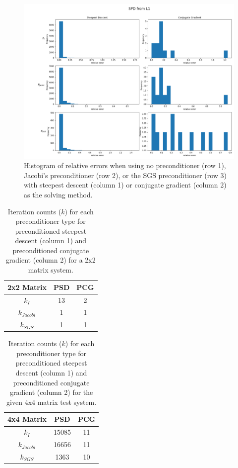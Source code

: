 \documentclass[11pt]{article}
\begin{document}
\begin{figure}[h!]
	\hspace*{-3cm}
	\centering
	\includegraphics[width=1.3\linewidth]{../figures/SPD L1 Histogram}
	\caption{Histogram of relative errors when using no preconditioner (row 1), Jacobi's preconditioner (row 2), or the SGS preconditioner (row 3) with steepest descent (column 1) or conjugate gradient (column 2) as the solving method.}
	\label{fig:HistSPD}
\end{figure}
\clearpage



\begin{table}[h!]
	\centering
	\begin{tabular}{|c|c|c|}
	\hline
	2x2 Matrix   	 & PSD & PCG \\ \hline
	$k_I$        	 & 13  & 2   \\ \hline
	$k_{Jacobi}$ & 1   & 1   \\ \hline
	$k_{SGS}$     & 1   & 1   \\ \hline
	\end{tabular}
	\caption{Iteration counts ($k$) for each preconditioner type for preconditioned steepest descent (column 1) and preconditioned conjugate gradient (column 2) for a 2x2 matrix system.}
	\label{tab:k2}
\end{table}

\begin{table}[h!]
	\centering
	\begin{tabular}{|c|c|c|}
	\hline
	4x4 Matrix  	 & PSD  & PCG \\ \hline
	$k_I$        	 & 15085 & 11  \\ \hline
	$k_{Jacobi}$  & 16656 & 11  \\ \hline
	$k_{SGS}$     & 1363  & 10  \\ \hline
	\end{tabular}
	\caption{Iteration counts ($k$) for each preconditioner type for preconditioned steepest descent (column 1) and preconditioned conjugate gradient (column 2) for the given 4x4 matrix test system.}
	\label{tab:ktest}
\end{table}
\end{document}
